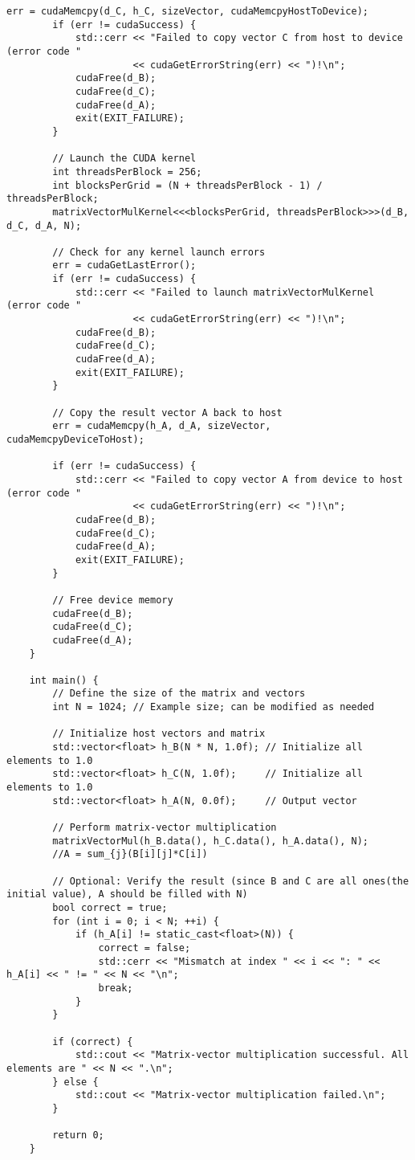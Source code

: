 \documentclass{article}
\begin{document}
\begin{lstlisting}[breaklines=true]
        err = cudaMemcpy(d_C, h_C, sizeVector, cudaMemcpyHostToDevice);
        if (err != cudaSuccess) {
            std::cerr << "Failed to copy vector C from host to device (error code " 
                      << cudaGetErrorString(err) << ")!\n";
            cudaFree(d_B);
            cudaFree(d_C);
            cudaFree(d_A);
            exit(EXIT_FAILURE);
        }
    
        // Launch the CUDA kernel
        int threadsPerBlock = 256;
        int blocksPerGrid = (N + threadsPerBlock - 1) / threadsPerBlock;
        matrixVectorMulKernel<<<blocksPerGrid, threadsPerBlock>>>(d_B, d_C, d_A, N);
    
        // Check for any kernel launch errors
        err = cudaGetLastError();
        if (err != cudaSuccess) {
            std::cerr << "Failed to launch matrixVectorMulKernel (error code " 
                      << cudaGetErrorString(err) << ")!\n";
            cudaFree(d_B);
            cudaFree(d_C);
            cudaFree(d_A);
            exit(EXIT_FAILURE);
        }
    
        // Copy the result vector A back to host
        err = cudaMemcpy(h_A, d_A, sizeVector, cudaMemcpyDeviceToHost);

        if (err != cudaSuccess) {
            std::cerr << "Failed to copy vector A from device to host (error code " 
                      << cudaGetErrorString(err) << ")!\n";
            cudaFree(d_B);
            cudaFree(d_C);
            cudaFree(d_A);
            exit(EXIT_FAILURE);
        }
    
        // Free device memory
        cudaFree(d_B);
        cudaFree(d_C);
        cudaFree(d_A);
    }
    
    int main() {
        // Define the size of the matrix and vectors
        int N = 1024; // Example size; can be modified as needed
    
        // Initialize host vectors and matrix
        std::vector<float> h_B(N * N, 1.0f); // Initialize all elements to 1.0
        std::vector<float> h_C(N, 1.0f);     // Initialize all elements to 1.0
        std::vector<float> h_A(N, 0.0f);     // Output vector
    
        // Perform matrix-vector multiplication
        matrixVectorMul(h_B.data(), h_C.data(), h_A.data(), N);
        //A = sum_{j}(B[i][j]*C[i])
    
        // Optional: Verify the result (since B and C are all ones(the initial value), A should be filled with N)
        bool correct = true;
        for (int i = 0; i < N; ++i) {
            if (h_A[i] != static_cast<float>(N)) {
                correct = false;
                std::cerr << "Mismatch at index " << i << ": " << h_A[i] << " != " << N << "\n";
                break;
            }
        }
    
        if (correct) {
            std::cout << "Matrix-vector multiplication successful. All elements are " << N << ".\n";
        } else {
            std::cout << "Matrix-vector multiplication failed.\n";
        }
    
        return 0;
    }
\end{lstlisting}
\end{document}
